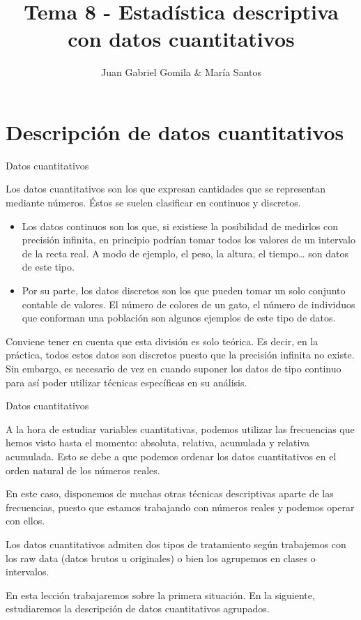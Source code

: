 \documentclass[
  ignorenonframetext,
]{beamer}
\title{Tema 8 - Estadística descriptiva con datos cuantitativos}
\author{Juan Gabriel Gomila \& María Santos}
\date{}
\begin{document}
\frame{\titlepage}

\hypertarget{descripciuxf3n-de-datos-cuantitativos}{%
\section{Descripción de datos
cuantitativos}\label{descripciuxf3n-de-datos-cuantitativos}}

\begin{frame}{Datos cuantitativos}
\protect\hypertarget{datos-cuantitativos}{}

Los datos cuantitativos son los que expresan cantidades que se
representan mediante números. Éstos se suelen clasificar en continuos y
discretos.

\begin{itemize}
\item
  Los datos continuos son los que, si existiese la posibilidad de
  medirlos con precisión infinita, en principio podrían tomar todos los
  valores de un intervalo de la recta real. A modo de ejemplo, el peso,
  la altura, el tiempo\ldots{} son datos de este tipo.
\item
  Por su parte, los datos discretos son los que pueden tomar un solo
  conjunto contable de valores. El número de colores de un gato, el
  número de individuos que conforman una población son algunos ejemplos
  de este tipo de datos.
\end{itemize}

Conviene tener en cuenta que esta división es solo teórica. Es decir, en
la práctica, todos estos datos son discretos puesto que la precisión
infinita no existe. Sin embargo, es necesario de vez en cuando suponer
los datos de tipo continuo para así poder utilizar técnicas específicas
en su análisis.

\end{frame}

\begin{frame}{Datos cuantitativos}
\protect\hypertarget{datos-cuantitativos-1}{}

A la hora de estudiar variables cuantitativas, podemos utilizar las
frecuencias que hemos visto hasta el momento: absoluta, relativa,
acumulada y relativa acumulada. Esto se debe a que podemos ordenar los
datos cuantitativos en el orden natural de los números reales.

En este caso, disponemos de muchas otras técnicas descriptivas aparte de
las frecuencias, puesto que estamos trabajando con números reales y
podemos operar con ellos.

Los datos cuantitativos admiten dos tipos de tratamiento según
trabajemos con los raw data (datos brutos u originales) o bien los
agrupemos en clases o intervalos.

En esta lección trabajaremos sobre la primera situación. En la
siguiente, estudiaremos la descripción de datos cuantitativos agrupados.

\end{frame}
\end{document}
